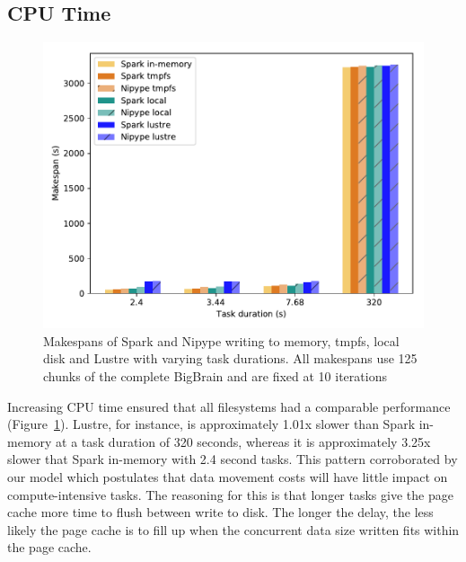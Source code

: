 \documentclass{IEEEtran}
\begin{document}
\subsection{CPU Time}
%
\begin{figure}[h]
    \centering
    \includegraphics[width=\linewidth]{results/figures/cputime.pdf}
    \caption{Makespans of Spark and Nipype writing to memory, tmpfs, local 
             disk and Lustre with varying task durations. All 
             makespans use 125 chunks of the complete BigBrain and are fixed at 
             10 iterations}\label{fig:cputime}
\end{figure}

Increasing CPU time ensured that all filesystems had a comparable performance
(Figure~\ref{fig:cputime}). Lustre, for instance, is approximately 1.01x slower
than Spark in-memory at a task duration of 320 seconds, whereas it is 
approximately 3.25x slower that Spark in-memory with 2.4 second tasks. This 
pattern corroborated by our model which postulates that 
data movement costs will have little impact on compute-intensive tasks. The 
reasoning for this is that longer tasks give the page cache more time to flush 
between write to disk. The longer the delay, the less likely the page cache is 
to fill up when the concurrent data size written fits within the page cache.
\end{document}
